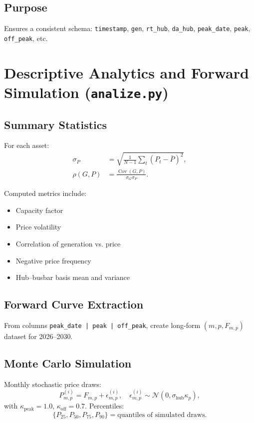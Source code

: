 \documentclass[12pt]{article}
\begin{document}
\subsection{Purpose}
Ensures a consistent schema: \texttt{timestamp}, \texttt{gen}, \texttt{rt\_hub}, \texttt{da\_hub}, \texttt{peak\_date}, \texttt{peak}, \texttt{off\_peak}, etc.

\section{Descriptive Analytics and Forward Simulation (\texttt{analize.py})}

\subsection{Summary Statistics}
For each asset:
\begin{align*}
\sigma_P &= \sqrt{\frac{1}{N-1}\sum_t (P_t - \bar P)^2}, \\
\rho(G,P) &= \frac{\operatorname{Cov}(G,P)}{\sigma_G \sigma_P}.
\end{align*}

Computed metrics include:
\begin{itemize}
    \item Capacity factor
    \item Price volatility
    \item Correlation of generation vs. price
    \item Negative price frequency
    \item Hub–busbar basis mean and variance
\end{itemize}

\subsection{Forward Curve Extraction}
From columns \texttt{peak\_date | peak | off\_peak}, create long-form \( (m, p, F_{m,p}) \) dataset for 2026--2030.

\subsection{Monte Carlo Simulation}
Monthly stochastic price draws:
\[
P^{(i)}_{m,p} = F_{m,p} + \epsilon^{(i)}_{m,p}, \quad
\epsilon^{(i)}_{m,p} \sim \mathcal{N}(0, \sigma_{\text{hub}} \kappa_p),
\]
with $\kappa_{\text{peak}} = 1.0$, $\kappa_{\text{off}} = 0.7$.
Percentiles:
\[
\{P_{25}, P_{50}, P_{75}, P_{90}\} = \text{quantiles of simulated draws}.
\]
\end{document}
